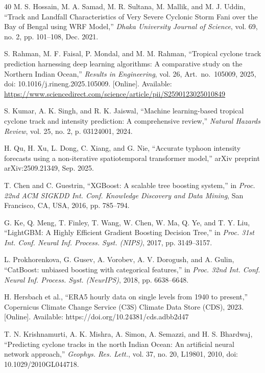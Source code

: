 \documentclass[conference]{IEEEtran}
\begin{document}
\begin{thebibliography}{40}
M. S. Hossain, M. A. Samad, M. R. Sultana, M. Mallik, and M. J. Uddin, ``Track and Landfall Characteristics of Very Severe Cyclonic Storm Fani over the Bay of Bengal using WRF Model,'' \textit{Dhaka University Journal of Science}, vol. 69, no. 2, pp. 101--108, Dec. 2021.

S. Rahman, M. F. Faisal, P. Mondal, and M. M. Rahman, ``Tropical cyclone track prediction harnessing deep learning algorithms: A comparative study on the Northern Indian Ocean,'' \textit{Results in Engineering}, vol. 26, Art.\ no.\ 105009, 2025, doi: 10.1016/j.rineng.2025.105009. [Online]. Available: \url{https://www.sciencedirect.com/science/article/pii/S2590123025010849}

S. Kumar, A. K. Singh, and R. K. Jaiswal, ``Machine learning-based tropical cyclone track and intensity prediction: A comprehensive review,'' \textit{Natural Hazards Review}, vol. 25, no. 2, p. 03124001, 2024.

H. Qu, H. Xu, L. Dong, C. Xiang, and G. Nie, ``Accurate typhoon intensity forecasts using a non-iterative spatiotemporal transformer model,'' arXiv preprint arXiv:2509.21349, Sep. 2025.

T. Chen and C. Guestrin, ``XGBoost: A scalable tree boosting system,'' in \textit{Proc. 22nd ACM SIGKDD Int. Conf. Knowledge Discovery and Data Mining}, San Francisco, CA, USA, 2016, pp. 785--794.

G. Ke, Q. Meng, T. Finley, T. Wang, W. Chen, W. Ma, Q. Ye, and T. Y. Liu, ``LightGBM: A Highly Efficient Gradient Boosting Decision Tree,'' in \textit{Proc. 31st Int. Conf. Neural Inf. Process. Syst. (NIPS)}, 2017, pp. 3149--3157.

L. Prokhorenkova, G. Gusev, A. Vorobev, A. V. Dorogush, and A. Gulin, ``CatBoost: unbiased boosting with categorical features,'' in \textit{Proc. 32nd Int. Conf. Neural Inf. Process. Syst. (NeurIPS)}, 2018, pp. 6638--6648.

H. Hersbach et al., ``ERA5 hourly data on single levels from 1940 to present,'' Copernicus Climate Change Service (C3S) Climate Data Store (CDS), 2023. [Online]. Available: https://doi.org/10.24381/cds.adbb2d47

T. N. Krishnamurti, A. K. Mishra, A. Simon, A. Semazzi, and H. S. Bhardwaj, ``Predicting cyclone tracks in the north Indian Ocean: An artificial neural network approach,'' \textit{Geophys. Res. Lett.}, vol. 37, no. 20, L19801, 2010, doi: 10.1029/2010GL044718.


\end{thebibliography}
\end{document}

